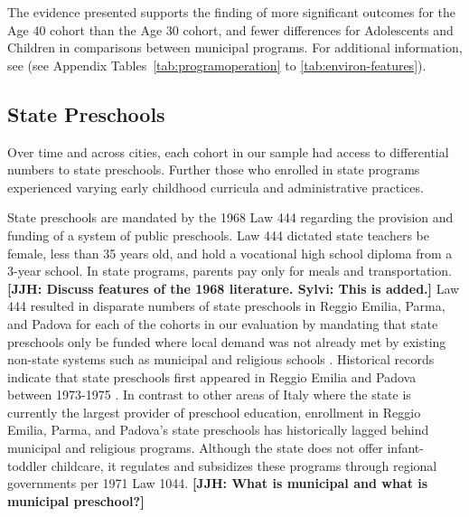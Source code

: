 The evidence presented supports the finding of more significant outcomes for the Age 40 cohort than the Age 30 cohort, and fewer differences for Adolescents and Children in comparisons between municipal programs. For additional information, see (see Appendix Tables~\ref{tab:programoperation} to \ref{tab:environ-features}). 

\subsection{State Preschools}

Over time and across cities, each cohort in our sample had access to differential numbers to state preschools. Further those who enrolled in state programs experienced varying early childhood curricula and administrative practices.

State preschools are mandated by the 1968 Law 444 regarding the provision and funding of a system of public preschools. Law 444 dictated state teachers be female, less than 35 years old, and hold a vocational high school diploma from a 3-year school. In state programs, parents pay only for meals and transportation. \textbf{[JJH: Discuss features of the 1968 literature. Sylvi: This is added.]} Law 444 resulted in disparate numbers of state preschools in Reggio Emilia, Parma, and Padova for each of the cohorts in our evaluation by mandating that state preschools only be funded where local demand was not already met by existing non-state systems such as municipal and religious schools \citep{Hohnerlein_2009_Paradox-Public-Preschools}. Historical records indicate that state preschools first appeared in Reggio Emilia and Padova between 1973-1975 \citep{Padova-Admin-Data_1964-2011,Reggio-Admin-data_1966-2006,Reggio-Annual-Journals_1994-2011}. In contrast to other areas of Italy where the state is currently the largest provider of preschool education, enrollment in Reggio Emilia, Parma, and Padova's state preschools has historically lagged behind municipal and religious programs. Although the state does not offer infant-toddler childcare, it regulates and subsidizes these programs through regional governments per 1971 Law 1044.
\textbf{[JJH: What is municipal and what is municipal preschool?]}

